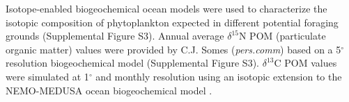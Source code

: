 \documentclass[a4paper,12pt]{article}
\begin{document}


Isotope-enabled biogeochemical ocean models \cite{magozzi2017using,schmittner2016complementary} were used to characterize the isotopic composition of phytoplankton expected in different potential foraging grounds (Supplemental Figure S3). 
Annual average $\delta^{15}$N POM (particulate organic matter) values were provided by C.J. Somes (\textit{pers.comm}) based on a 5$^{\circ}$ resolution biogeochemical model (Supplemental Figure S3). 
$\delta^{13}$C POM values were simulated at 1$^{\circ}$ and monthly resolution using an isotopic extension to the NEMO-MEDUSA ocean biogeochemical model \cite{magozzi2017using,yool2013medusa}. 
\end{document}
